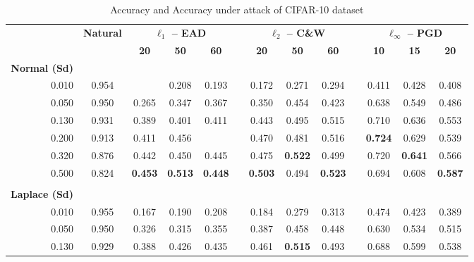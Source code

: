 \begin{table}[htb]
  \centering
  \tiny
  \caption{Accuracy and Accuracy under attack of CIFAR-10 dataset}
  \label{table:ap3-cifar10-appendix}%
    \begin{tabular}{rcccccccccccc}
    \toprule
          & \multirow{2}[3]{*}{\textbf{Natural}} & \multicolumn{3}{c}{\textbf{$\ell_1$ -- EAD}} &       & \multicolumn{3}{c}{\textbf{$\ell_2$ -- C\&W}} &       & \multicolumn{3}{c}{\textbf{$\ell_\infty$ -- PGD}} \\
\cmidrule{3-5}\cmidrule{7-9}\cmidrule{11-13}          &       & \textbf{20} & \textbf{50} & \textbf{60} &       & \textbf{20} & \textbf{50} & \textbf{60} &       & \textbf{10} & \textbf{15} & \textbf{20} \\
    \textbf{Normal (Sd)} &       &       &       &       &       &       &       &       &       &       &       &  \\
    \midrule
    0.010 & 0.954 &       & 0.208 & 0.193 &       & 0.172 & 0.271 & 0.294 &       & 0.411 & 0.428 & 0.408 \\
    0.050 & 0.950 & 0.265 & 0.347 & 0.367 &       & 0.350 & 0.454 & 0.423 &       & 0.638 & 0.549 & 0.486 \\
    0.130 & 0.931 & 0.389 & 0.401 & 0.411 &       & 0.443 & 0.495 & 0.515 &       & 0.710 & 0.636 & 0.553 \\
    0.200 & 0.913 & 0.411 & 0.456 &       &       & 0.470 & 0.481 & 0.516 &       & \textbf{0.724} & 0.629 & 0.539 \\
    0.320 & 0.876 & 0.442 & 0.450 & 0.445 &       & 0.475 & \textbf{0.522} & 0.499 &       & 0.720 & \textbf{0.641} & 0.566 \\
    0.500 & 0.824 & \textbf{0.453} & \textbf{0.513} & \textbf{0.448} &       & \textbf{0.503} & 0.494 & \textbf{0.523} &       & 0.694 & 0.608 & \textbf{0.587} \\
          &       &       &       &       &       &       &       &       &       &       &       &  \\
    \textbf{Laplace (Sd)} &       &       &       &       &       &       &       &       &       &       &       &  \\
    \midrule
    0.010 & 0.955 & 0.167 & 0.190 & 0.208 &       & 0.184 & 0.279 & 0.313 &       & 0.474 & 0.423 & 0.389 \\
    0.050 & 0.950 & 0.326 & 0.315 & 0.355 &       & 0.387 & 0.458 & 0.448 &       & 0.630 & 0.534 & 0.515 \\
    0.130 & 0.929 & 0.388 & 0.426 & 0.435 &       & 0.461 & \textbf{0.515} & 0.493 &       & 0.688 & 0.599 & 0.538 \\

\end{tabular}
\end{table}
